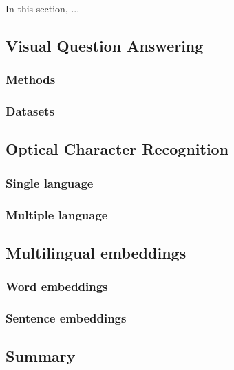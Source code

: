 In this section, ...

\cite{DBLP:journals/corr/abs-2006-00923, Hu_2020_CVPR, vinyals2017pointer, DBLP:journals/corr/SmithTHH17, Biten_2019_ICCV, Singh_2019_CVPR, Gurari_2018_CVPR, borisyuk2018rosetta, 8978122, DBLP:journals/corr/abs-1807-09956, singh2018pythia, wang2010word, DBLP:journals/corr/VeitMNMB16, mishra:hal-00818183, Johnson_2017_CVPR, DBLP:journals/corr/abs-1810-04805, krishnavisualgenome, pennington2014glove, jawanpuria2019learning, 10.1162/tacl_a_00288, chen2018unsupervised, TIEDEMANN12.463, conneau2017word, speer2017conceptnet,  joulin2016bag,  bojanowski2017enriching, mikolov2013exploiting}

\subsection{Visual Question Answering}
\subsubsection{Methods}
\subsubsection{Datasets}

\subsection{Optical Character Recognition}
\subsubsection{Single language}
\subsubsection{Multiple language}

\subsection{Multilingual embeddings}
\subsubsection{Word embeddings}
\subsubsection{Sentence embeddings}

\subsection{Summary}